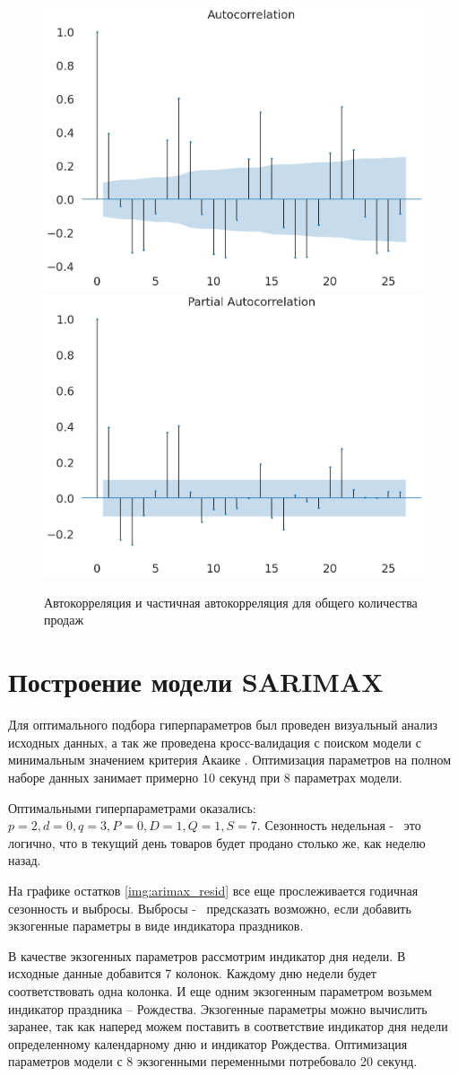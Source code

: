 \def\figurename{Рис}
\begin{figure}[t]
	\centering
	\includegraphics[width=0.4\columnwidth]{./img/sales_autocorrelation.png}
	\includegraphics[width=0.4\columnwidth]{./img/sales_partial_autocorrelation.png}
	\caption{Автокорреляция и частичная автокорреляция для общего количества продаж}
	\label{img:any_autocorrelation}
\end{figure}



\section{Построение модели SARIMAX}

Для оптимального подбора гиперпараметров был проведен
визуальный анализ исходных данных, а так же проведена
кросс-валидация с поиском модели с минимальным значением критерия Акаике \cite{akaike}.
Оптимизация параметров на полном наборе данных занимает примерно 10 секунд при 8 параметрах модели.

Оптимальными гиперпараметрами оказались:
$ p = 2, d = 0, q = 3, P = 0, D = 1, Q = 1, S = 7 $.
Сезонность недельная  -~ это логично, что в текущий день
товаров будет продано столько же, как неделю назад.

На графике остатков \ref{img:arimax_resid} все еще прослеживается
годичная сезонность и выбросы. Выбросы -~ предсказать возможно, если
добавить экзогенные параметры в виде индикатора праздников.

В качестве экзогенных параметров рассмотрим индикатор дня недели.
В исходные данные добавится 7 колонок. Каждому дню недели
будет соответствовать одна колонка. И еще одним экзогенным параметром
возьмем индикатор праздника -- Рождества.
Экзогенные параметры можно вычислить заранее, так как наперед можем
поставить в соответствие индикатор дня недели определенному календарному дню
и индикатор Рождества.
Оптимизация параметров модели с 8 экзогенными переменными потребовало 20 секунд.

